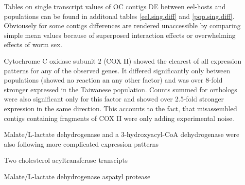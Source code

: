 Tables on single transcript values of OC contigs DE between eel-hosts
and populations can be found in additonal tables \ref{eel.sing.diff}
and \ref{pop.sing.diff}. Obviousely for some contigs differences are
rendered unaccessible by comparing simple mean values because of
superposed interaction effects or overwhelming effects of worm sex.

Cytochrome C oxidase subunit 2 (COX II) showed the clearest of all
expression patterns for any of the observed genes. It differed
significantly only between populations (showed no reaction an any
other factor) and was over 8-fold stronger expressed in the Taiwanese
population. Counts summed for orthologs were also significant only for
this factor and showed over 2.5-fold stronger expression in the same
direction. This accounts to the fact, that misassembled contigs
containing fragments of COX II were only adding experimental noise.

Malate/L-lactate dehydrogenase and a 3-hydroxyacyl-CoA dehydrogenase
were also following more complicated expression patterns

Two cholesterol acyltransferase transcipts

Malate/L-lactate dehydrogenase    aspatyl protease





